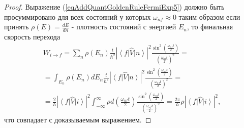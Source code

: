 \begin{proof}
  Выражение (\ref{eqAddQuantGoldenRuleFermiExp5}) должно быть
  просуммировано для всех состояний у которых $\omega_{nf} \approx 0$
  таким образом если принять $\rho(E) = \frac{dE}{dn}$ - плотность
  состояний с энергией $E_n$, то финальная скорость перехода
  \begin{eqnarray}
    W_{i \rightarrow f} = \sum_n \rho\left(E_n\right) 
    \frac{t}{\hbar^2}
    \left|\left<f\right|\hat{V}\left|n\right>\right|^2
    \frac{\sin^2\left(\frac{ \omega_{nf} t}{2}\right)}
         {\left(\frac{ \omega_{nf} t}{2}\right)^2} =
    \\ \nonumber
    = 
    \int_{E_n} \rho\left(E_n\right) d E_n      \frac{t}{\hbar^2}
    \left|\left<f\right|\hat{V}\left|n\right>\right|^2
    \frac{\sin^2\left(\frac{ \omega_{nf} t}{2}\right)}
         {\left(\frac{ \omega_{nf} t}{2}\right)^2} =
    \\ \nonumber
    =
    \frac{2}{\hbar}
    \left|\left<f\right|\hat{V}\left|i\right>\right|^2
    \int_{-\infty}^{\infty}
    \rho d \left(\frac{ \omega_{nf} t}{2}\right)
    \frac{\sin^2\left(\frac{ \omega_{nf} t}{2}\right)}
         {\left(\frac{ \omega_{nf} t}{2}\right)^2} =
    \frac{2 \pi}{\hbar} \rho
    \left|\left<f\right|\hat{V}\left|i\right>\right|^2,
    \label{eqAddQuantGoldenRuleFermiExp6}
  \end{eqnarray}
  что совпадает с доказываемым выражением.
  
  
\end{proof}
